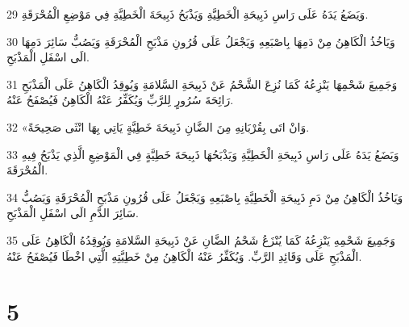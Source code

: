 \par 29 وَيَضَعُ يَدَهُ عَلَى رَاسِ ذَبِيحَةِ الْخَطِيَّةِ وَيَذْبَحُ ذَبِيحَةَ الْخَطِيَّةِ فِي مَوْضِعِ الْمُحْرَقَةِ.
\par 30 وَيَاخُذُ الْكَاهِنُ مِنْ دَمِهَا بِاصْبَعِهِ وَيَجْعَلُ عَلَى قُرُونِ مَذْبَحِ الْمُحْرَقَةِ وَيَصُبُّ سَائِرَ دَمِهَا الَى اسْفَلِ الْمَذْبَحِ.
\par 31 وَجَمِيعَ شَحْمِهَا يَنْزِعُهُ كَمَا نُزِعَ الشَّحْمُ عَنْ ذَبِيحَةِ السَّلامَةِ وَيُوقِدُ الْكَاهِنُ عَلَى الْمَذْبَحِ رَائِحَةَ سُرُورٍ لِلرَّبِّ وَيُكَفِّرُ عَنْهُ الْكَاهِنُ فَيُصْفَحُ عَنْهُ.
\par 32 «وَانْ اتَى بِقُرْبَانِهِ مِنَ الضَّانِ ذَبِيحَةَ خَطِيَّةٍ يَاتِي بِهَا انْثَى صَحِيحَةً.
\par 33 وَيَضَعُ يَدَهُ عَلَى رَاسِ ذَبِيحَةِ الْخَطِيَّةِ وَيَذْبَحُهَا ذَبِيحَةَ خَطِيَّةٍ فِي الْمَوْضِعِ الَّذِي يَذْبَحُ فِيهِ الْمُحْرَقَةَ.
\par 34 وَيَاخُذُ الْكَاهِنُ مِنْ دَمِ ذَبِيحَةِ الْخَطِيَّةِ بِاصْبَعِهِ وَيَجْعَلُ عَلَى قُرُونِ مَذْبَحِ الْمُحْرَقَةِ وَيَصُبُّ سَائِرَ الدَّمِ الَى اسْفَلِ الْمَذْبَحِ.
\par 35 وَجَمِيعَ شَحْمِهِ يَنْزِعُهُ كَمَا يُنْزَعُ شَحْمُ الضَّانِ عَنْ ذَبِيحَةِ السَّلامَةِ وَيُوقِدُهُ الْكَاهِنُ عَلَى الْمَذْبَحِ عَلَى وَقَائِدِ الرَّبِّ. وَيُكَفِّرُ عَنْهُ الْكَاهِنُ مِنْ خَطِيَّتِهِ الَّتِي اخْطَا فَيُصْفَحُ عَنْهُ.

\chapter{5}

